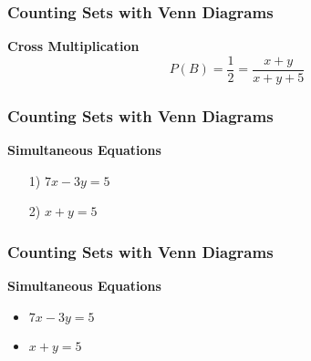 \documentclass[IntroMain.tex]{subfiles}
\begin{document}
	
	\begin{frame}
		\frametitle{Counting Sets with Venn Diagrams}
		\Large
		\vspace{-2.5cm}
		\textbf{Cross Multiplication}
		\[ P(B) = \frac{1}{2} = \frac{x+y}{x+y+5} \]
		
	\end{frame}
	
	
	\begin{frame}
		\frametitle{Counting Sets with Venn Diagrams}
		\Large
		\vspace{-2.8cm}
		\textbf{Simultaneous Equations}
		\begin{itemize}
			\item[1)] $7x-3y=5$
			\item[2)] $x+y=5$
		\end{itemize}
	\end{frame}
	
	\begin{frame}
		\frametitle{Counting Sets with Venn Diagrams}
		\Large
		\vspace{-2.8cm}
		\textbf{Simultaneous Equations}
		\begin{itemize}
			\item $7x-3y=5$
			\item $x+y=5$
		\end{itemize}
	\end{frame}
\end{document}
